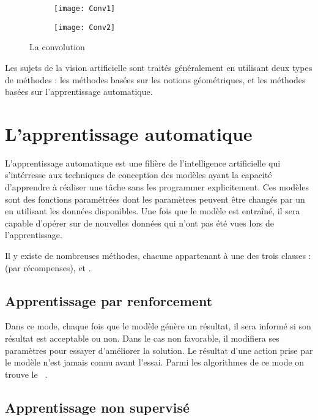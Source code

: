\begin{figure}[H]
\centering
\begin{subfigure}{0.45\textwidth}
\texttt{[image: Conv1]}
\end{subfigure}
\begin{subfigure}{0.45\textwidth}
\texttt{[image: Conv2]}
\end{subfigure}
\caption{La convolution}{\cite{commonsConvolution}}
\end{figure}

Les sujets de la vision artificielle sont traités généralement en utilisant deux
types de méthodes : les méthodes basées sur les notions géométriques,
et les méthodes basées sur l'apprentissage automatique.

\section{L'apprentissage automatique}

L'apprentissage automatique est une filière de
l'intelligence artificielle qui s'intérresse aux techniques de conception des
modèles ayant la capacité d'apprendre à réaliser une tâche sans les programmer
explicitement. Ces modèles sont des fonctions paramétrées dont les paramètres
peuvent être changés par un  en utilisant les données
disponibles. Une fois que le modèle est entraîné, il sera capable d'opérer sur
de nouvelles données qui n'ont pas été vues lors de l'apprentissage.

Il y existe de nombreuses méthodes, chacune appartenant à
une des trois classes :
 (par récompenses),
 et
.

\subsection{Apprentissage par renforcement}

Dans ce mode, chaque fois que le modèle génère un résultat, il sera informé
si son résultat est acceptable ou non. Dans le cas non favorable, il modifiera
ses paramètres pour essayer d'améliorer la solution. Le résultat d'une action
prise par le modèle n'est jamais connu avant l'essai. Parmi les algorithmes de ce
mode on trouve le ~\cite{Watkins1992}.

\subsection{Apprentissage non supervisé}

